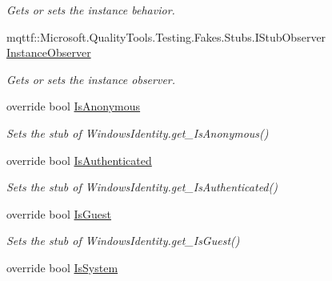 \begin{DoxyCompactItemize}
\begin{DoxyCompactList}\small\item\em Gets or sets the instance behavior.\end{DoxyCompactList}\item 
mqttf\-::\-Microsoft.\-Quality\-Tools.\-Testing.\-Fakes.\-Stubs.\-I\-Stub\-Observer \hyperlink{class_system_1_1_security_1_1_principal_1_1_fakes_1_1_stub_windows_identity_ab4c475b8720795232c823b39e0bc6dcf}{Instance\-Observer}
\begin{DoxyCompactList}\small\item\em Gets or sets the instance observer.\end{DoxyCompactList}\item 
override bool \hyperlink{class_system_1_1_security_1_1_principal_1_1_fakes_1_1_stub_windows_identity_abb94545c48986aaad9039abb21e82159}{Is\-Anonymous}
\begin{DoxyCompactList}\small\item\em Sets the stub of Windows\-Identity.\-get\-\_\-\-Is\-Anonymous()\end{DoxyCompactList}\item 
override bool \hyperlink{class_system_1_1_security_1_1_principal_1_1_fakes_1_1_stub_windows_identity_ac2d1ba3c9e257c737a8ce726628f99ee}{Is\-Authenticated}
\begin{DoxyCompactList}\small\item\em Sets the stub of Windows\-Identity.\-get\-\_\-\-Is\-Authenticated()\end{DoxyCompactList}\item 
override bool \hyperlink{class_system_1_1_security_1_1_principal_1_1_fakes_1_1_stub_windows_identity_a469d5cb34fc8b006734e97308a80f9bd}{Is\-Guest}
\begin{DoxyCompactList}\small\item\em Sets the stub of Windows\-Identity.\-get\-\_\-\-Is\-Guest()\end{DoxyCompactList}\item 
override bool \hyperlink{class_system_1_1_security_1_1_principal_1_1_fakes_1_1_stub_windows_identity_ae78569bbc510472dd9d8f19178287025}{Is\-System}

\end{DoxyCompactItemize}
